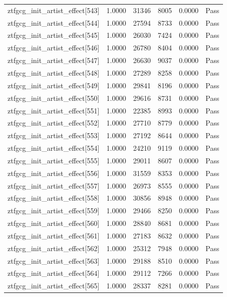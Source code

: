 \begin{table}[htbp]
\begin{tabular}{llrrll}
ztfgcg\_init\_artist\_effect[543] & 1.0000 & 31346 & 8005 & 0.0000 & Pass \\
ztfgcg\_init\_artist\_effect[544] & 1.0000 & 27594 & 8733 & 0.0000 & Pass \\
ztfgcg\_init\_artist\_effect[545] & 1.0000 & 26030 & 7424 & 0.0000 & Pass \\
ztfgcg\_init\_artist\_effect[546] & 1.0000 & 26780 & 8404 & 0.0000 & Pass \\
ztfgcg\_init\_artist\_effect[547] & 1.0000 & 26630 & 9037 & 0.0000 & Pass \\
ztfgcg\_init\_artist\_effect[548] & 1.0000 & 27289 & 8258 & 0.0000 & Pass \\
ztfgcg\_init\_artist\_effect[549] & 1.0000 & 29841 & 8196 & 0.0000 & Pass \\
ztfgcg\_init\_artist\_effect[550] & 1.0000 & 29616 & 8731 & 0.0000 & Pass \\
ztfgcg\_init\_artist\_effect[551] & 1.0000 & 22385 & 8993 & 0.0000 & Pass \\
ztfgcg\_init\_artist\_effect[552] & 1.0000 & 27710 & 8779 & 0.0000 & Pass \\
ztfgcg\_init\_artist\_effect[553] & 1.0000 & 27192 & 8644 & 0.0000 & Pass \\
ztfgcg\_init\_artist\_effect[554] & 1.0000 & 24210 & 9119 & 0.0000 & Pass \\
ztfgcg\_init\_artist\_effect[555] & 1.0000 & 29011 & 8607 & 0.0000 & Pass \\
ztfgcg\_init\_artist\_effect[556] & 1.0000 & 31559 & 8353 & 0.0000 & Pass \\
ztfgcg\_init\_artist\_effect[557] & 1.0000 & 26973 & 8555 & 0.0000 & Pass \\
ztfgcg\_init\_artist\_effect[558] & 1.0000 & 30856 & 8948 & 0.0000 & Pass \\
ztfgcg\_init\_artist\_effect[559] & 1.0000 & 29466 & 8250 & 0.0000 & Pass \\
ztfgcg\_init\_artist\_effect[560] & 1.0000 & 28840 & 8681 & 0.0000 & Pass \\
ztfgcg\_init\_artist\_effect[561] & 1.0000 & 27183 & 8632 & 0.0000 & Pass \\
ztfgcg\_init\_artist\_effect[562] & 1.0000 & 25312 & 7948 & 0.0000 & Pass \\
ztfgcg\_init\_artist\_effect[563] & 1.0000 & 29188 & 8510 & 0.0000 & Pass \\
ztfgcg\_init\_artist\_effect[564] & 1.0000 & 29112 & 7266 & 0.0000 & Pass \\
ztfgcg\_init\_artist\_effect[565] & 1.0000 & 28337 & 8281 & 0.0000 & Pass \\

\end{tabular}
\end{table}

